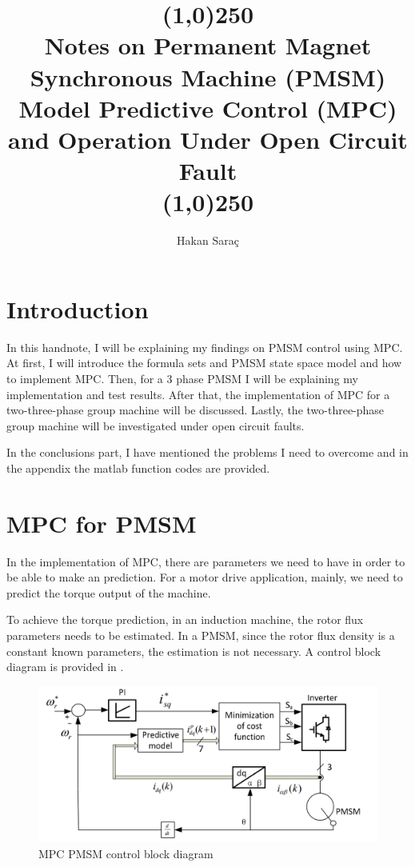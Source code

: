 \documentclass{article}
\author{\hisfont Hakan Saraç}
\date{}
\begin{document}
\title{\line(1,0){250}\\\myfont Notes on Permanent Magnet Synchronous Machine (PMSM) Model Predictive Control (MPC) and Operation Under Open Circuit Fault\\\line(1,0){250}}
\maketitle
\newpage
\tableofcontents
\newpage


\section{Introduction}
In this handnote, I will be explaining my findings on PMSM control using MPC. At first, I will introduce the formula sets and PMSM state space model and how to implement MPC. Then, for a 3 phase PMSM I will be explaining my implementation and test results. After that, the implementation of MPC for a two-three-phase group machine will be discussed. Lastly, the two-three-phase group machine will be investigated under open circuit faults.

In the conclusions part, I have mentioned the problems I need to overcome and in the appendix the matlab function codes are provided.


\section{MPC for PMSM}
In the implementation of MPC, there are parameters we need to have in order to be able to make an prediction. For a motor drive application, mainly, we need to predict the torque output of the machine. 

To achieve the torque prediction, in an induction machine, the rotor flux parameters needs to be estimated. In a PMSM, since the rotor flux density is a constant known parameters, the estimation is not necessary. A control block diagram is provided in \citep{ExperimentalImplementationOfModelPredictiveControlForPermanentMagnetSynchronousMotor}.

\begin{figure}[H]
\centering
\includegraphics[scale=0.5]{Figures/MPC_PMSM_block_diagram.PNG}
\caption{MPC PMSM control block diagram \citep{ExperimentalImplementationOfModelPredictiveControlForPermanentMagnetSynchronousMotor}}
\label{fig:MpcPmsmBlockDiagram}
\end{figure}
\end{document}
